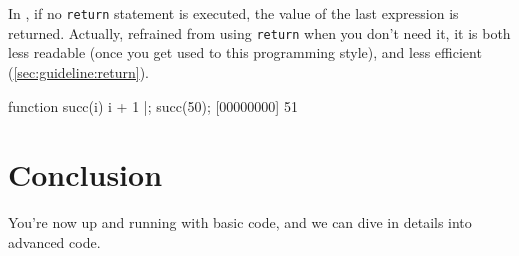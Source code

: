 In \us, if no \lstinline{return} statement is executed, the value of the
last expression is returned.  Actually, refrained from using
\lstinline{return} when you don't need it, it is both less readable (once
you get used to this programming style), and less efficient
(\autoref{sec:guideline:return}).

\begin{urbiscript}
function succ(i) { i + 1 }|;
succ(50);
[00000000] 51
\end{urbiscript}

\section{Conclusion}

You're now up and running with basic \us code, and we can dive in
details into advanced \us code.

